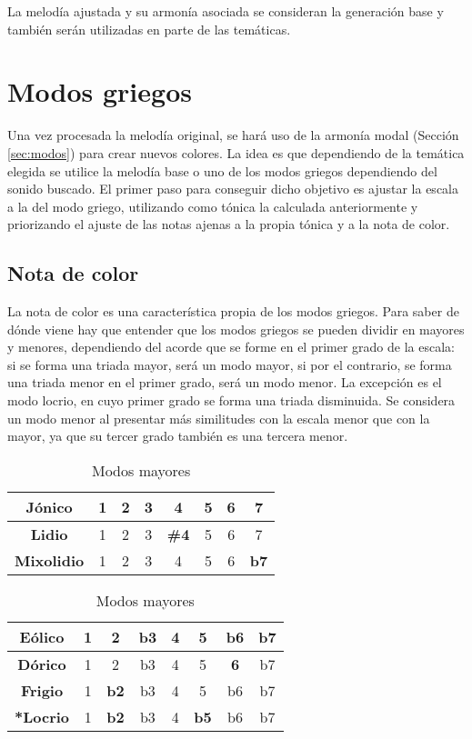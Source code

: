 La melodía ajustada y su armonía asociada se consideran la generación base y también serán utilizadas en parte de las temáticas.

\section{Modos griegos}

Una vez procesada la melodía original, se hará uso de la armonía modal (Sección \ref{sec:modos}) para crear nuevos colores. La idea es que dependiendo de la temática elegida se utilice la melodía base o uno de los modos griegos dependiendo del sonido buscado. El primer paso para conseguir dicho objetivo es ajustar la escala a la del modo griego, utilizando como tónica la calculada anteriormente y priorizando el ajuste de las notas ajenas a la propia tónica y a la nota de color.

\subsection{Nota de color}

La nota de color es una característica propia de los modos griegos. Para saber de dónde viene hay que entender que los modos griegos se pueden dividir en mayores y menores, dependiendo del acorde que se forme en el primer grado de la escala: si se forma una triada mayor, será un modo mayor, si por el contrario, se forma una triada menor en el primer grado, será un modo menor. La excepción es el modo locrio, en cuyo primer grado se forma una triada disminuida. Se considera un modo menor al presentar más similitudes con la escala menor que con la mayor, ya que su tercer grado también es una tercera menor.

\begin{table}[h]
    \centering
    \begin{tabular}{c||c|c|c|c|c|c|c}
    \textbf{Jónico} & 1 & 2 & 3 & 4 & 5 & 6 & 7 \\
        \hline
        \hline
        \textbf{Lidio} & 1 & 2 & 3 & \textbf{\#4} & 5 & 6 & 7 \\
        \hline
        \textbf{Mixolidio} & 1 & 2 & 3 & 4 & 5 & 6 & \textbf{b7} \\
    \end{tabular}
    \caption{Modos mayores}
    \label{tab:modos_mayores}
\end{table}

\begin{table}[h]
    \centering
    \begin{tabular}{c||c|c|c|c|c|c|c}
        \textbf{Eólico} & 1 & 2 & b3 & 4 & 5 & b6 & b7 \\
        \hline
        \hline
        \textbf{Dórico} & 1 & 2 & b3 & 4 & 5 & \textbf{6} & b7  \\
        \hline
        \textbf{Frigio} & 1 & \textbf{b2} & b3 & 4 & 5 & b6 & b7 \\
        \hline
        \textbf{*Locrio} & 1 & \textbf{b2} & b3 & 4 & \textbf{b5} & b6 & b7
    \end{tabular}
    \caption{Modos mayores}
    \label{tab:modos_menores}
\end{table}

